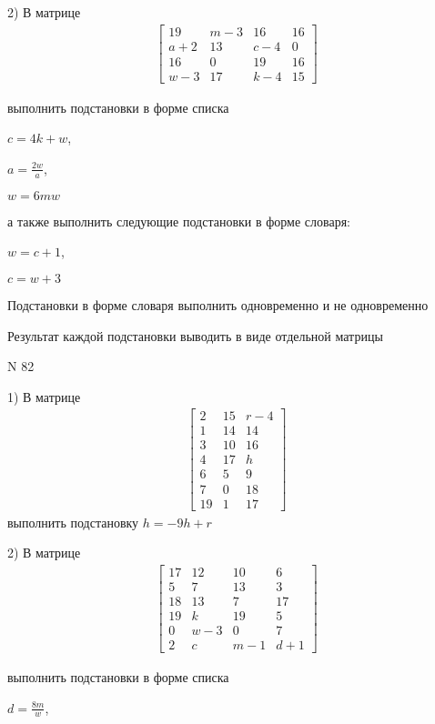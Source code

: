 \documentclass[11pt]{report}
\begin{document}
    2) В матрице
\begin{align*}
\left[\begin{matrix}19 & m - 3 & 16 & 16\\a + 2 & 13 & c - 4 & 0\\16 & 0 & 19 & 16\\w - 3 & 17 & k - 4 & 15\end{matrix}\right]
\end{align*}

выполнить подстановки в форме списка

$c=4 k + w$,

$a=\frac{2 w}{a}$,

$w=6 m w$

а также выполнить следующие подстановки в форме словаря:

$w=c + 1$,

$c=w + 3$


    Подстановки в форме словаря выполнить одновременно и не одновременно


    Результат каждой подстановки выводить в виде отдельной матрицы

\newpage
N 82


    1) В матрице
\begin{align*}
\left[\begin{matrix}2 & 15 & r - 4\\1 & 14 & 14\\3 & 10 & 16\\4 & 17 & h\\6 & 5 & 9\\7 & 0 & 18\\19 & 1 & 17\end{matrix}\right]
\end{align*}
выполнить подстановку $h=- 9 h + r$


    2) В матрице
\begin{align*}
\left[\begin{matrix}17 & 12 & 10 & 6\\5 & 7 & 13 & 3\\18 & 13 & 7 & 17\\19 & k & 19 & 5\\0 & w - 3 & 0 & 7\\2 & c & m - 1 & d + 1\end{matrix}\right]
\end{align*}

выполнить подстановки в форме списка

$d=\frac{8 m}{w}$,
\end{document}
